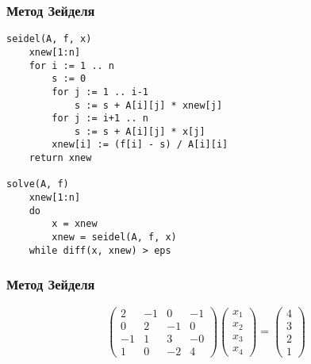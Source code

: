 \documentclass[10pt]{beamer}
\begin{document}
\begin{frame}[fragile]
\frametitle{Метод Зейделя}
\begin{lstlisting}
seidel(A, f, x)
	xnew[1:n]
    for i := 1 .. n
        s := 0
        for j := 1 .. i-1
            s := s + A[i][j] * xnew[j]
        for j := i+1 .. n
            s := s + A[i][j] * x[j]
        xnew[i] := (f[i] - s) / A[i][i]
    return xnew

solve(A, f)
	xnew[1:n]
	do
		x = xnew
		xnew = seidel(A, f, x)
	while diff(x, xnew) > eps
\end{lstlisting}
\end{frame}

\begin{frame}[fragile]
\frametitle{Метод Зейделя}

$$
\begin{pmatrix}
2 & -1 & 0 & -1 \\
0 & 2 & -1 & 0 \\
-1 & 1 & 3 & -0 \\
1 & 0 & -2 & 4 
\end{pmatrix}
\begin{pmatrix}
x_1 \\
x_2 \\	
x_3 \\
x_4
\end{pmatrix}
=
\begin{pmatrix}
4 \\
3 \\
2 \\
1
\end{pmatrix}
$$
\end{frame}
\end{document}
